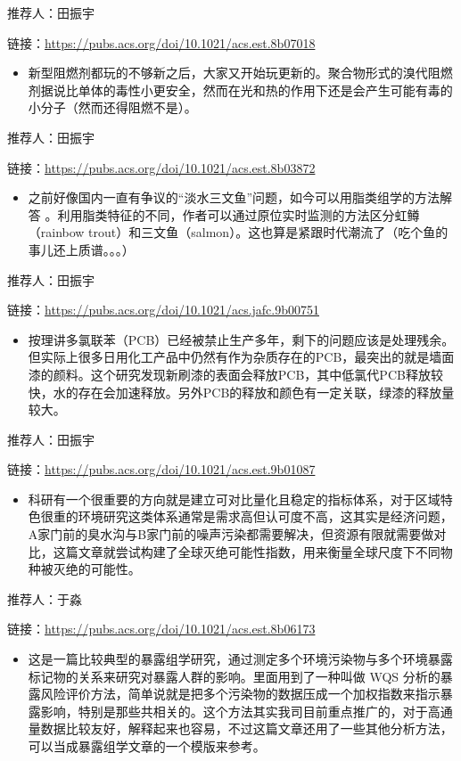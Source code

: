 \documentclass[]{book}
\providecommand{\tightlist}{%
  \setlength{\itemsep}{0pt}\setlength{\parskip}{0pt}}
\begin{document}
推荐人：田振宇

链接：\url{https://pubs.acs.org/doi/10.1021/acs.est.8b07018}

\begin{itemize}
\tightlist
\item
  新型阻燃剂都玩的不够新之后，大家又开始玩更新的。聚合物形式的溴代阻燃剂据说比单体的毒性小更安全，然而在光和热的作用下还是会产生可能有毒的小分子（然而还得阻燃不是）。
\end{itemize}

推荐人：田振宇

链接：\url{https://pubs.acs.org/doi/10.1021/acs.est.8b03872}

\begin{itemize}
\tightlist
\item
  之前好像国内一直有争议的``淡水三文鱼''问题，如今可以用脂类组学的方法解答 。利用脂类特征的不同，作者可以通过原位实时监测的方法区分虹鳟（rainbow trout）和三文鱼（salmon）。这也算是紧跟时代潮流了（吃个鱼的事儿还上质谱。。。）
\end{itemize}

推荐人：田振宇

链接：\url{https://pubs.acs.org/doi/10.1021/acs.jafc.9b00751}

\begin{itemize}
\tightlist
\item
  按理讲多氯联苯（PCB）已经被禁止生产多年，剩下的问题应该是处理残余。但实际上很多日用化工产品中仍然有作为杂质存在的PCB，最突出的就是墙面漆的颜料。这个研究发现新刷漆的表面会释放PCB，其中低氯代PCB释放较快，水的存在会加速释放。另外PCB的释放和颜色有一定关联，绿漆的释放量较大。
\end{itemize}

推荐人：田振宇

链接：\url{https://pubs.acs.org/doi/10.1021/acs.est.9b01087}

\begin{itemize}
\tightlist
\item
  科研有一个很重要的方向就是建立可对比量化且稳定的指标体系，对于区域特色很重的环境研究这类体系通常是需求高但认可度不高，这其实是经济问题，A家门前的臭水沟与B家门前的噪声污染都需要解决，但资源有限就需要做对比，这篇文章就尝试构建了全球灭绝可能性指数，用来衡量全球尺度下不同物种被灭绝的可能性。
\end{itemize}

推荐人：于淼

链接：\url{https://pubs.acs.org/doi/10.1021/acs.est.8b06173}

\begin{itemize}
\tightlist
\item
  这是一篇比较典型的暴露组学研究，通过测定多个环境污染物与多个环境暴露标记物的关系来研究对暴露人群的影响。里面用到了一种叫做 WQS 分析的暴露风险评价方法，简单说就是把多个污染物的数据压成一个加权指数来指示暴露影响，特别是那些共相关的。这个方法其实我司目前重点推广的，对于高通量数据比较友好，解释起来也容易，不过这篇文章还用了一些其他分析方法，可以当成暴露组学文章的一个模版来参考。
\end{itemize}
\end{document}
